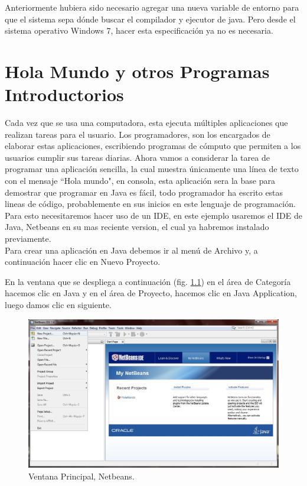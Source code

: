 \documentclass[12pt]{book} %
\begin{document}
Anteriormente hubiera sido necesario agregar una nueva variable de entorno para que el sistema sepa dónde buscar el compilador y ejecutor de java. Pero desde el sistema operativo Windows 7, hacer esta especificación ya no es necesaria.


\chapter{Hola Mundo y otros Programas Introductorios}

Cada vez que se usa una computadora, esta ejecuta múltiples aplicaciones que realizan tareas para el usuario. Los programadores, son los encargados de elaborar estas aplicaciones, escribiendo programas de cómputo que permiten a los usuarios cumplir sus tareas diarias.
Ahora vamos a considerar la tarea de programar una aplicación sencilla, la cual muestra únicamente una línea de texto con el mensaje ``Hola mundo", en consola, esta aplicación sera la base para demostrar que programar en Java es fácil, todo programador ha escrito estas lineas de código, probablemente en sus inicios en este lenguaje de programación.
Para esto necesitaremos hacer uso de un IDE, en este ejemplo usaremos el IDE de Java, Netbeans en su mas reciente version, el cual ya habremos instalado previamente. \\Para crear una aplicación en Java debemos ir al menú de Archivo y, a continuación hacer clic en Nuevo Proyecto.

En la ventana que se despliega a continuación (fig. \ref{hw01}) en el área de Categoría hacemos clic en Java y en el área de Proyecto, hacemos clic en Java Application, luego damos clic en siguiente.

	\begin{figure}[h]
		\centering
			\includegraphics[width=16cm]{Hola_mundo_001.jpg}
			\caption{Ventana Principal, Netbeans.}
			\label{hw01}
	\end{figure}
\end{document}
